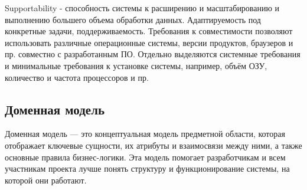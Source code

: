 Supportability - способность системы к расширению и масштабированию и выполнению большего объема обработки данных. Адаптируемость под конкретные задачи, поддерживаемость.
Требования к совместимости позволяют использовать различные операционные системы, версии продуктов, браузеров и пр. совместно с разработанным ПО. Отдельно выделяются системные требования и минимальные требования к установке системы, например, объём
ОЗУ, количество и частота процессоров и пр.

\subsection[Доменная модель]{Доменная модель}
Доменная модель — это концептуальная модель предметной области, которая отображает ключевые сущности, их атрибуты и взаимосвязи между ними, а также основные правила бизнес-логики. Эта модель помогает разработчикам и всем участникам проекта лучше понять структуру и функционирование системы, на которой они работают.

